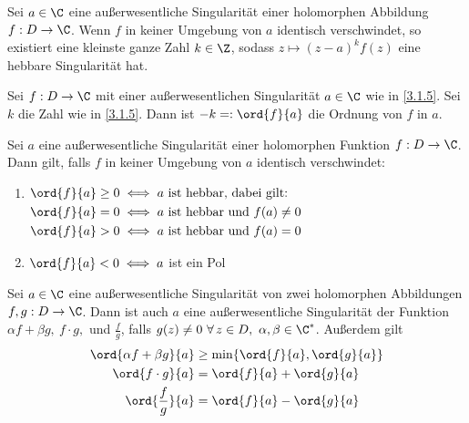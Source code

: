 		\begin{prop}\label{3.1.5}
			Sei $a \in \C$ eine außerwesentliche Singularität einer holomorphen Abbildung $ f: D \to \C $. Wenn $f$ in keiner Umgebung von $a$ identisch verschwindet, so existiert eine kleinste ganze Zahl $k \in \Z$, sodass $ z \mapsto (z-a)^kf(z) $ eine hebbare Singularität hat.
		\end{prop}
		
		\begin{defn}[Ordnung]
			Sei $ f: D \to \C $ mit einer außerwesentlichen Singularität $ a \in \C $ wie in \ref{3.1.5}. Sei $k$ die Zahl wie in \ref{3.1.5}. Dann ist $ -k =: \ord{f}{a} $ die Ordnung von $f$ in $a$.
		\end{defn}
		
		\begin{prop}
			Sei $a$ eine außerwesentliche Singularität einer holomorphen Funktion $f: D \to \C$. Dann gilt, falls $f$ in keiner Umgebung von $a$ identisch verschwindet:
			\begin{enumerate}[label={\roman*})]
				\item $\begin{aligned}[t]
					\ord{f}{a} \geq 0 &\iff a\ \text{ist hebbar, dabei gilt:}\\
					\ord{f}{a} = 0 &\iff a\ \text{ist hebbar und } f(a) \neq 0\\
					\ord{f}{a} > 0 &\iff a\ \text{ist hebbar und } f(a) = 0
				\end{aligned}$
				\item $ \ord{f}{a} < 0 \iff a $ ist ein Pol
			\end{enumerate}
		\end{prop}
		
		\begin{prop}
			Sei $ a \in \C $ eine außerwesentliche Singularität von zwei holomorphen Abbildungen $ f,g: D \to \C $. Dann ist auch $a$ eine außerwesentliche Singularität der Funktion $ \alpha f + \beta g,\ f \cdot g, $ und $ \frac{f}{g} $, falls $g(z) \neq 0 \ \forall\, z \in D,\ \alpha,\beta \in \C^*$.	Außerdem gilt
			\begin{align*}
				\ord{\alpha f + \beta g}{a} &\geq \min\{\ord{f}{a},\ord{g}{a}\}\\
				\ord{f\cdot g}{a} &= \ord{f}{a} + \ord{g}{a}\\
				\ord{\frac{f}{g}}{a} &= \ord{f}{a} - \ord{g}{a}
			\end{align*}
		\end{prop}